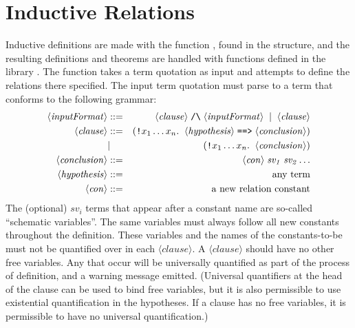 \section{Inductive Relations}

Inductive definitions are made with the function , found
in the  structure, and the resulting definitions and
theorems are handled with functions defined in the library
. The  function takes a
term quotation as input and attempts to define the relations there
specified.  The input term quotation must parse to a term that
conforms to the following grammar:
\newcommand{\nonterm}[1]{\ensuremath{\langle\mathit{#1}\rangle}}
\begin{eqnarray*}
   \nonterm{inputFormat} &::=& \nonterm{clause} \;\holtxt{/\bk}\; \nonterm{inputFormat} \;\;|\;\; \nonterm{clause}\\
   \nonterm{clause}       &::=& (\holtxt{!}x_1 \dots
   x_n. \;\;\nonterm{hypothesis} \;\holtxt{==>}
   \;\nonterm{conclusion})\\
   &|& (\holtxt{!}x_1\dots x_n.\;\;\nonterm{conclusion})\\
   \nonterm{conclusion}   &::=& \nonterm{con} \;\mathit{sv_1}\; \mathit{sv_2} \dots\\
   \nonterm{hypothesis}   &::=& \mbox{any term}\\
   \nonterm{con}          &::=& \mbox{a new relation constant}
\end{eqnarray*}
The (optional) $\mathit{sv}_i$ terms that appear after a constant name
are so-called ``schematic variables''.  The same variables must always
follow all new constants throughout the definition.  These variables
and the names of the constants-to-be must not be quantified over in
each {\nonterm{clause}}.  A {\nonterm{clause}} should have no other
free variables.  Any that occur will be universally quantified as part
of the process of definition, and a warning message emitted.
(Universal quantifiers at the head of the clause can be used to bind
free variables, but it is also permissible to use existential
quantification in the hypotheses.  If a clause has no free variables,
it is permissible to have no universal quantification.)


